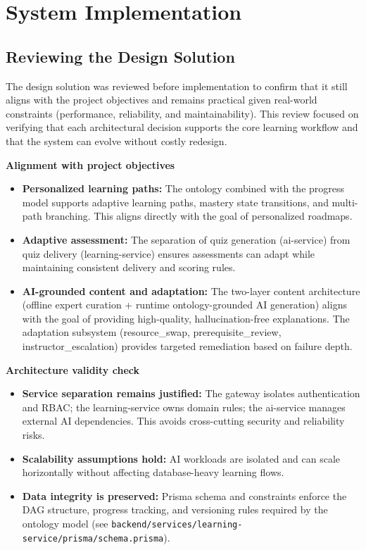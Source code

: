 \chapter{System Implementation}

\section{Reviewing the Design Solution}

The design solution was reviewed before implementation to confirm that it still aligns with the project objectives and remains practical given real-world constraints (performance, reliability, and maintainability). This review focused on verifying that each architectural decision supports the core learning workflow and that the system can evolve without costly redesign.

\textbf{Alignment with project objectives}

\begin{itemize}
    \item \textbf{Personalized learning paths:} The ontology combined with the progress model supports adaptive learning paths, mastery state transitions, and multi-path branching. This aligns directly with the goal of personalized roadmaps.
    \item \textbf{Adaptive assessment:} The separation of quiz generation (ai-service) from quiz delivery (learning-service) ensures assessments can adapt while maintaining consistent delivery and scoring rules.
    \item \textbf{AI-grounded content and adaptation:} The two-layer content architecture (offline expert curation + runtime ontology-grounded AI generation) aligns with the goal of providing high-quality, hallucination-free explanations. The adaptation subsystem (resource\_swap, prerequisite\_review, instructor\_escalation) provides targeted remediation based on failure depth.
\end{itemize}

\textbf{Architecture validity check}

\begin{itemize}
    \item \textbf{Service separation remains justified:} The gateway isolates authentication and RBAC; the learning-service owns domain rules; the ai-service manages external AI dependencies. This avoids cross-cutting security and reliability risks.
    \item \textbf{Scalability assumptions hold:} AI workloads are isolated and can scale horizontally without affecting database-heavy learning flows.
    \item \textbf{Data integrity is preserved:} Prisma schema and constraints enforce the DAG structure, progress tracking, and versioning rules required by the ontology model (see \texttt{backend/services/learning-service/prisma/schema.prisma}).
\end{itemize}

